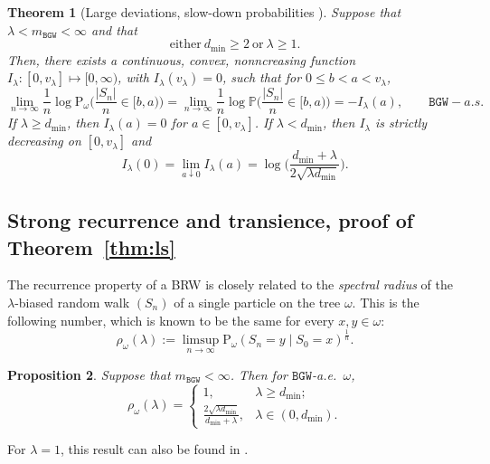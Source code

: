 \documentclass[11 pt]{article}
\newtheorem{theorem}{Theorem}[section]
\newtheorem{proposition}[theorem]{Proposition}
\theoremstyle{definition}
\numberwithin{equation}{section}
\newcommand{\PP}{\mathbb{P}} %
\newcommand{\Pws}{\mathrm{P}_{\omega}} %
\begin{document}
\begin{theorem}[Large deviations, slow-down probabilities {\cite[Theorem~1.2]{DGPZ-ld}}]\label{lem:ld2}
	Suppose that  $\lambda < m_{\mathtt{BGW}}<\infty$ and that 
	\begin{equation}\label{eq:ldc}
		\text{either}~ d_{\min}\ge 2 ~\text{or}~ \lambda\ge 1. 
	\end{equation}
	Then, there exists a continuous, convex, nonncreasing function 
	$I_{\lambda}: [0,v_{\lambda}]\mapsto [0,\infty)$, with $I_{\lambda}(v_{\lambda})= 0$, such that for $0\le
 	b<a<v_{\lambda}$, 
	\begin{equation}
		\lim_{n\to \infty} \frac{1}{n}\log \Pws \Big( \frac{|S_n|}{n}\in [b,a) \Big)
		= \lim_{n\to \infty}  \frac{1}{n} \log \PP \Big( \frac{|S_n|}{n}\in [b,a) \Big) = -I_{\lambda}(a), \qquad 		\mathtt{BGW}-a.s.
	\end{equation}
	If $\lambda\ge d_{\min}$, then $I_{\lambda} (a)=0$ for $a\in [0,v_{\lambda}]$. 
	If $\lambda< d_{\min}$, then $I_{\lambda}$ is strictly decreasing on $[0,v_{\lambda}]$ and 
\begin{equation}\label{rf-at-0}
I_{\lambda}(0) = \lim_{a\downarrow 0} I_{\lambda}(a)= \log \Big(\frac{d_{\min}+\lambda}
	{2\sqrt{\lambda d_{\min}}}\Big) .
\end{equation}
\end{theorem}


\subsection{Strong recurrence and transience, proof of Theorem~\ref{thm:ls}}\label{subsection:recurrence_and_transience}

The recurrence property of a BRW is closely related to the \emph{spectral radius} of the $\lambda$-biased random walk $(S_n)$ of a single particle on the tree $\omega$. This is the following number, which is known to be the same for every $x,y\in \omega$:  
\begin{equation}\label{spectral-radius-def}
\rho_{\omega}(\lambda):=\limsup_{n\to \infty} \Pws(S_n= y \mid S_0= x)^{\frac{1}{n}}. 
\end{equation}


\begin{proposition}\label{prop:sr}
	Suppose that  $m_{\mathtt{BGW}}<\infty$. 
	Then  for $\mathtt{BGW}$-a.e.\ $\omega$,  
		\begin{equation}
		\rho_{\omega}(\lambda)=
		\begin{cases}
			1,& \lambda\ge d_{\min}; \\
			\frac{2\sqrt{\lambda d_{\min}}}{d_{\min}+\lambda} , & \lambda\in (0,d_{\min}). 				
		\end{cases}
	\end{equation}
\end{proposition}
For $\lambda=1$, this result can also be found in \cite[Proposition~3.5]{Su2014}. 
\end{document}
